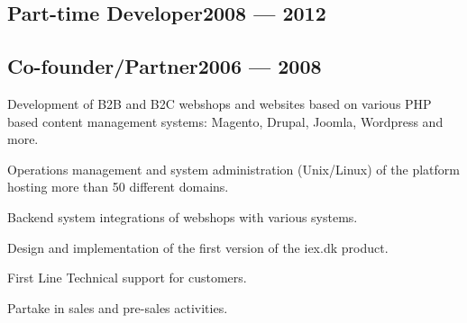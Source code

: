 \subsection{{Part-time Developer\hfill 2008 --- 2012}}
\subsection{{Co-founder/Partner\hfill 2006 --- 2008}}

\begin{zitemize}
	\item Development of B2B and B2C webshops and websites based on various PHP based content management systems: Magento, Drupal, Joomla, Wordpress and more.
	\item Operations management and system administration (Unix/Linux) of the platform hosting more than 50 different domains.
	\item Backend system integrations of webshops with various systems.
	\item Design and implementation of the first version of the iex.dk product.
	\item First Line Technical support for customers.
	\item Partake in sales and pre-sales activities.
\end{zitemize}

